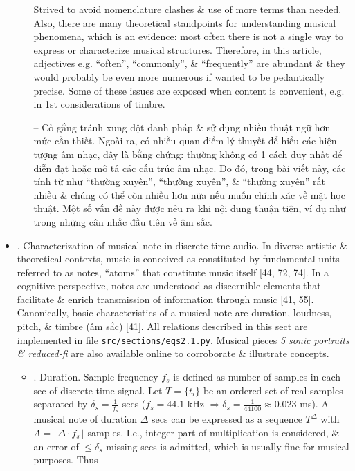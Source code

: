 \documentclass{article}
\begin{document}
\begin{itemize}
\begin{itemize}
\begin{itemize}
		\end{itemize}
		Strived to avoid nomenclature clashes \& use of more terms than needed. Also, there are many theoretical standpoints for understanding musical phenomena, which is an evidence: most often there is not a single way to express or characterize musical structures. Therefore, in this article, adjectives e.g. ``often'', ``commonly'', \& ``frequently'' are abundant \& they would probably be even more numerous if wanted to be pedantically precise. Some of these issues are exposed when content is convenient, e.g. in 1st considerations of timbre.
		
		-- Cố gắng tránh xung đột danh pháp \& sử dụng nhiều thuật ngữ hơn mức cần thiết. Ngoài ra, có nhiều quan điểm lý thuyết để hiểu các hiện tượng âm nhạc, đây là bằng chứng: thường không có 1 cách duy nhất để diễn đạt hoặc mô tả các cấu trúc âm nhạc. Do đó, trong bài viết này, các tính từ như ``thường xuyên'', ``thường xuyên'', \& ``thường xuyên'' rất nhiều \& chúng có thể còn nhiều hơn nữa nếu muốn chính xác về mặt học thuật. Một số vấn đề này được nêu ra khi nội dung thuận tiện, ví dụ như trong những cân nhắc đầu tiên về âm sắc.
	\end{itemize}	
	\item {. Characterization of musical note in discrete-time audio.} In diverse artistic \& theoretical contexts, music is conceived as constituted by fundamental units referred to as notes, ``atoms'' that constitute music itself [44, 72, 74]. In a cognitive perspective, notes are understood as discernible elements that facilitate \& enrich transmission of information through music [41, 55]. Canonically, basic characteristics of a musical note are duration, loudness, pitch, \& timbre (âm sắc) [41]. All relations described in this sect are implemented in file {\tt src/sections/eqs2.1.py}. Musical pieces {\it5 sonic portraits \& reduced-fi} are also available online to corroborate \& illustrate concepts.
	\begin{itemize}
		\item {. Duration.} Sample frequency $f_s$ is defined as number of samples in each sec of discrete-time signal. Let $T = \{t_i\}$ be an ordered set of real samples separated by $\delta_s = \frac{1}{f_s}$ secs ($f_s = 44.1$ kHz $\Rightarrow\delta_s = \frac{1}{44100}\approx0.023$ ms). A musical note of duration $\Delta$ secs can be expressed as a sequence $T^\Delta$ with $\Lambda = \lfloor\Delta\cdot f_s\rfloor$ samples. I.e., integer part of multiplication is considered, \& an error of $\le\delta_s$ missing secs is admitted, which is usually fine for musical purposes. Thus

\end{itemize}
\end{itemize}
\end{document}
